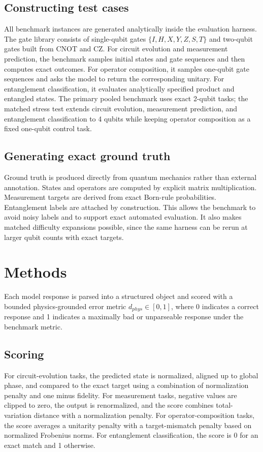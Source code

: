 \documentclass[11pt]{article}
\begin{document}
\subsection{Constructing test cases}
All benchmark instances are generated analytically inside the evaluation harness. The gate library consists of single-qubit gates $\{I,H,X,Y,Z,S,T\}$ and two-qubit gates built from $\mathrm{CNOT}$ and $\mathrm{CZ}$. For circuit evolution and measurement prediction, the benchmark samples initial states and gate sequences and then computes exact outcomes. For operator composition, it samples one-qubit gate sequences and asks the model to return the corresponding unitary. For entanglement classification, it evaluates analytically specified product and entangled states. The primary pooled benchmark uses exact 2-qubit tasks; the matched stress test extends circuit evolution, measurement prediction, and entanglement classification to 4 qubits while keeping operator composition as a fixed one-qubit control task.

\subsection{Generating exact ground truth}
Ground truth is produced directly from quantum mechanics rather than external annotation. States and operators are computed by explicit matrix multiplication. Measurement targets are derived from exact Born-rule probabilities. Entanglement labels are attached by construction. This allows the benchmark to avoid noisy labels and to support exact automated evaluation. It also makes matched difficulty expansions possible, since the same harness can be rerun at larger qubit counts with exact targets.

\section{Methods}
Each model response is parsed into a structured object and scored with a bounded physics-grounded error metric $d_{phys}\in[0,1]$, where 0 indicates a correct response and 1 indicates a maximally bad or unparseable response under the benchmark metric.

\subsection{Scoring}
For circuit-evolution tasks, the predicted state is normalized, aligned up to global phase, and compared to the exact target using a combination of normalization penalty and one minus fidelity. For measurement tasks, negative values are clipped to zero, the output is renormalized, and the score combines total-variation distance with a normalization penalty. For operator-composition tasks, the score averages a unitarity penalty with a target-mismatch penalty based on normalized Frobenius norms. For entanglement classification, the score is 0 for an exact match and 1 otherwise.
\end{document}
